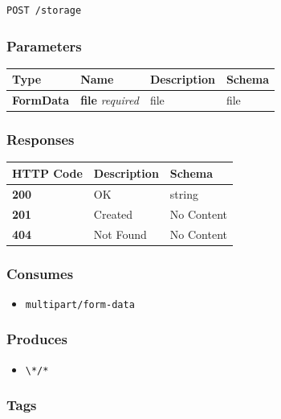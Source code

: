 \begin{verbatim}
POST /storage
\end{verbatim}

\subsubsection{Parameters}\label{parameters-12}

\begin{longtable}[]{@{}llll@{}}
\toprule
Type & Name & Description & Schema\tabularnewline
\midrule
\endhead
\textbf{FormData} & \textbf{file} \emph{required} & file &
file\tabularnewline
\bottomrule
\end{longtable}

\subsubsection{Responses}\label{responses-15}

\begin{longtable}[]{@{}lll@{}}
\toprule
HTTP Code & Description & Schema\tabularnewline
\midrule
\endhead
\textbf{200} & OK & string\tabularnewline
\textbf{201} & Created & No Content\tabularnewline
\textbf{404} & Not Found & No Content\tabularnewline
\bottomrule
\end{longtable}

\subsubsection{Consumes}\label{consumes-8}

\begin{itemize}
\tightlist
\item
  \texttt{multipart/form-data}
\end{itemize}

\subsubsection{Produces}\label{produces-15}

\begin{itemize}
\tightlist
\item
  \texttt{\textbackslash{}*/*}
\end{itemize}

\subsubsection{Tags}\label{tags-15}

